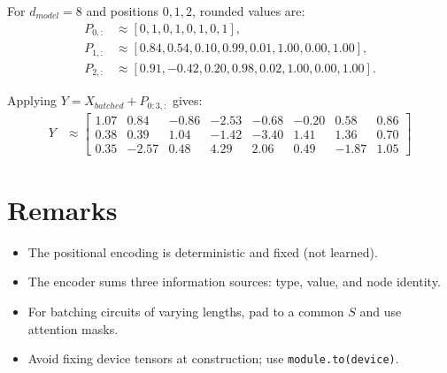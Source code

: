 \documentclass{article}
\begin{document}
For $d_{model}=8$ and positions $0,1,2$, rounded values are:
\begin{align*}
P_{0,:} &\approx [0, 1, 0, 1, 0, 1, 0, 1],\\
P_{1,:} &\approx [0.84, 0.54, 0.10, 0.99, 0.01, 1.00, 0.00, 1.00],\\
P_{2,:} &\approx [0.91, -0.42, 0.20, 0.98, 0.02, 1.00, 0.00, 1.00].
\end{align*}

Applying $Y = X_{batched} + P_{0:3, :}$ gives:
\begin{align*}
Y &\approx
\begin{bmatrix}
1.07 & 0.84 & -0.86 & -2.53 & -0.68 & -0.20 & 0.58 & 0.86 \\
0.38 & 0.39 & 1.04 & -1.42 & -3.40 & 1.41 & 1.36 & 0.70 \\
0.35 & -2.57 & 0.48 & 4.29 & 2.06 & 0.49 & -1.87 & 1.05
\end{bmatrix}
\end{align*}

\section*{Remarks}
\begin{itemize}
  \item The positional encoding is deterministic and fixed (not learned).
  \item The encoder sums three information sources: type, value, and node identity.
  \item For batching circuits of varying lengths, pad to a common $S$ and use attention masks.
  \item Avoid fixing device tensors at construction; use \texttt{module.to(device)}.
\end{itemize}
\end{document}
